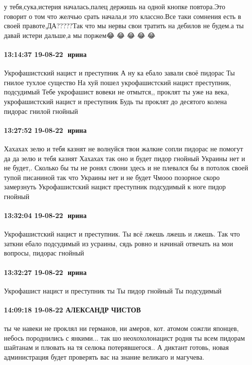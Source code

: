 у тебя,сука,истерия началась,палец держишь на одной кнопке повтора.Это говорит
о том что желчью срать начала,и это классно.Все таки сомнения есть в своей
правоте,ДА?????Так что мы нервы свои тратить на дебилов не будем.а ты давай
истери дальше,а мы поржем😂 😂 😂 😂 😂

\paragraph{13:14:37 19-08-22 🍏ирина 🍇🍇}

Укрофашистский нацист и преступник
А ну ка ебало завали своё пидорас
Ты гнилое тухлое существо
На хуй пошел укрофашистский нацист преступник, подсудимый
Тебе укрофашист вовеки не отмытся,, проклят ты уже на века, укрофашистский нацист и преступник
Будь ты проклят до десятого колена пидорас гнилой гнойный

\paragraph{13:27:52 19-08-22 🍏ирина 🍇🍇}

Хахахах зелю и тебя казнят не волнуйся твои жалкие сопли пидорас не помогут да да зелю и тебя казнят
Хахахах так оно и будет пидор гнойный
Украины нет и не будет,.
Сколько бы ты не ронял слюни здесь и не плевался бы в потолок своей тупой писаниной так что
Украины нет и не будет
Чмооо позорное скоро замерзнуть
Укрофашистский нацист преступник подсудимый к ноге пидор гнойный

\paragraph{13:32:04 19-08-22 🍏ирина 🍇🍇}

Укрофашистский нацист и преступник.
Ты всё лжешь лжешь и лжешь.
Так что заткни ебало подсудимый из усраины, сядь ровно и начинай отвечать на мои вопросы, пидорас гнойный

\paragraph{13:32:27 19-08-22 🍏ирина 🍇🍇}

Укрофашист нацист и преступник ты
Ты пидор гнойный
Ты подсудимый

\paragraph{14:09:18 19-08-22 АЛЕКСАНДР ЧИСТОВ}

ты че навеки не проклял ни германов, ни амеров, кот. атомом сожгли японцев,
небось породнились с янкими... так шо неохохолонацист родня ты всем пидорам
шайтанам и плювать на тя селюка потерявшегося.. А диктант готовь, новая
администрация будет проверять вас на знание великаго и магучева.

